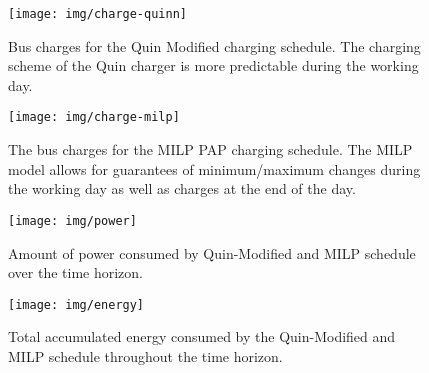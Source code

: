 \documentclass[utf8]{FrontiersinHarvard}
\begin{document}
\begin{subfigures}
    \begin{figure}[htpb]
    \centering
        \texttt{[image: img/charge-quinn]}
        \caption{Bus charges for the Quin Modified charging schedule. The charging scheme of the Quin charger is more predictable during the working day.}
        \label{subfig:quin-charge}
    \end{figure}

    \hfill

    \begin{figure}[htpb]
    \centering
        \texttt{[image: img/charge-milp]}
        \caption{The bus charges for the MILP PAP charging schedule. The MILP model allows for guarantees of minimum/maximum changes during the working day as well as charges at the end of the day.}
        \label{subfig:milp-charge}
    \end{figure}
\end{subfigures}

\begin{figure}[htpb]
\centering
    \texttt{[image: img/power]}
    \caption{Amount of power consumed by Quin-Modified and MILP schedule over the time horizon.}
    \label{fig:power-usage}
\end{figure}

\begin{figure}[htpb]
\centering
    \texttt{[image: img/energy]}
    \caption{Total accumulated energy consumed by the Quin-Modified and MILP schedule throughout the time horizon.}
    \label{fig:energy-usage}
\end{figure}
\end{document}
